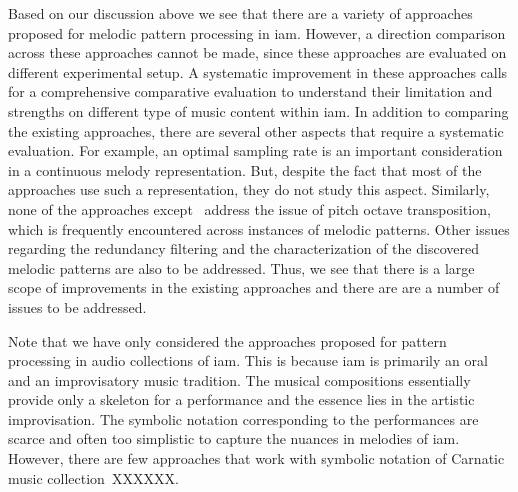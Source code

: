 {Based on our discussion above we see that there are a variety of approaches proposed for melodic pattern processing in \gls{iam}. However, a direction comparison across these approaches cannot be made, since these approaches are evaluated on different experimental setup. A systematic improvement in these approaches calls for a comprehensive comparative evaluation to understand their limitation and strengths on different type of music content within \gls{iam}. In addition to comparing the existing approaches, there are several other aspects that require a systematic evaluation. For example, an optimal sampling rate is an important consideration in a continuous melody representation. But, despite the fact that most of the approaches use such a representation, they do not study this aspect. Similarly, none of the approaches except~\cite{Rao2014} address the issue of pitch octave transposition, which is frequently encountered across instances of melodic patterns. Other issues regarding the redundancy filtering and the characterization of the discovered melodic patterns are also to be addressed. Thus, we see that there is a large scope of improvements in the existing approaches and there are are a number of issues to be addressed. 



Note that we have only considered the approaches proposed for pattern processing in audio collections of \gls{iam}. This is because \gls{iam} is primarily an oral and an improvisatory music tradition. The musical compositions essentially provide only a skeleton for a performance and the essence lies in the artistic improvisation. The symbolic notation corresponding to the performances are scarce and often too simplistic to capture the nuances in melodies of \gls{iam}. However, there are few approaches that work with symbolic notation of Carnatic music collection~XXXXXX. 


}
